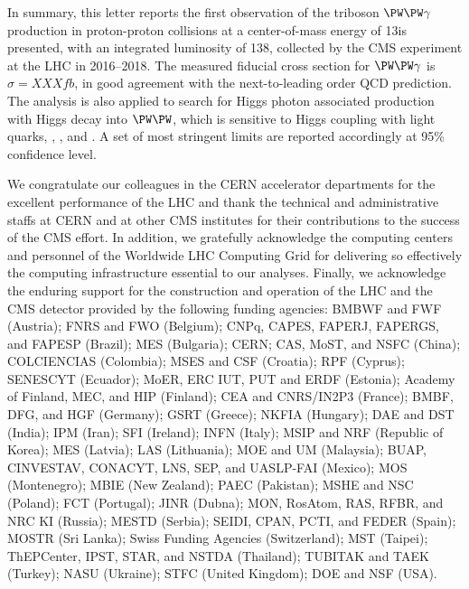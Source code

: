 \documentclass[11pt,twoside,a4paper,cmspaper]{cms-tdr}
\begin{document}
In summary, this letter reports the first observation of the triboson $\PW\PW\gamma$ production in proton-proton collisions at a center-of-mass energy of 13\TeV is presented, with an integrated luminosity of 138\fbinv, collected by the CMS experiment at the LHC in 2016--2018. The measured fiducial cross section for $\PW\PW\gamma$ is $\sigma=XXX\unit{fb}$, in good agreement with the next-to-leading order QCD prediction. The analysis is also applied to search for Higgs photon associated production with Higgs decay into $\PW\PW$, which is sensitive to Higgs coupling with light quarks, \PQc, \PQs, \PQu and \PQd. A set of most stringent limits are reported accordingly at 95\% confidence level.

\begin{acknowledgments}
We congratulate our colleagues in the CERN accelerator departments for the excellent performance of the LHC and thank the technical and administrative staffs at CERN and at other CMS institutes for their contributions to the success of the CMS effort. In addition, we gratefully acknowledge the computing centers and personnel of the Worldwide LHC Computing Grid for delivering so effectively the computing infrastructure essential to our analyses. Finally, we acknowledge the enduring support for the construction and operation of the LHC and the CMS detector provided by the following funding agencies: BMBWF and FWF (Austria); FNRS and FWO (Belgium); CNPq, CAPES, FAPERJ, FAPERGS, and FAPESP (Brazil); MES (Bulgaria); CERN; CAS, MoST, and NSFC (China); COLCIENCIAS (Colombia); MSES and CSF (Croatia); RPF (Cyprus); SENESCYT (Ecuador); MoER, ERC IUT, PUT and ERDF (Estonia); Academy of Finland, MEC, and HIP (Finland); CEA and CNRS/IN2P3 (France); BMBF, DFG, and HGF (Germany); GSRT (Greece); NKFIA (Hungary); DAE and DST (India); IPM (Iran); SFI (Ireland); INFN (Italy); MSIP and NRF (Republic of Korea); MES (Latvia); LAS (Lithuania); MOE and UM (Malaysia); BUAP, CINVESTAV, CONACYT, LNS, SEP, and UASLP-FAI (Mexico); MOS (Montenegro); MBIE (New Zealand); PAEC (Pakistan); MSHE and NSC (Poland); FCT (Portugal); JINR (Dubna); MON, RosAtom, RAS, RFBR, and NRC KI (Russia); MESTD (Serbia); SEIDI, CPAN, PCTI, and FEDER (Spain); MOSTR (Sri Lanka); Swiss Funding Agencies (Switzerland); MST (Taipei); ThEPCenter, IPST, STAR, and NSTDA (Thailand); TUBITAK and TAEK (Turkey); NASU (Ukraine); STFC (United Kingdom); DOE and NSF (USA). 
\end{acknowledgments}


\end{document}
